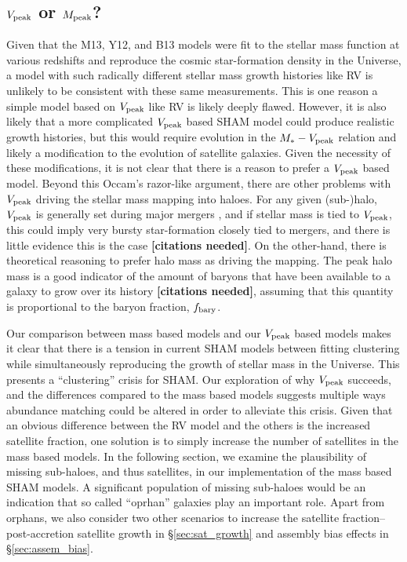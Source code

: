 \documentclass[a4paper,fleqn,usenatbib]{mnras}
\begin{document}
\subsection{$V_{\rm peak}$ or $M_{\rm peak}$?}

Given that the M13, Y12, and B13 models were fit to the stellar mass function at various redshifts and reproduce the cosmic star-formation density in the Universe, a model with such radically different stellar mass growth histories like RV is unlikely to be consistent with these same measurements.  This is one reason a simple model based on $V_{\rm peak}$ like RV is likely deeply flawed.  However, it is also likely that a more complicated $V_{\rm peak}$ based SHAM model could produce realistic growth histories, but this would require evolution in the $M_* - V_{\rm peak}$ relation and likely a modification to the evolution of satellite galaxies.  Given the necessity of these modifications, it is not clear that there is a reason to prefer a $V_{\rm peak}$ based model.  Beyond this Occam's razor-like argument, there are other problems with $V_{\rm peak}$ driving the stellar mass mapping into haloes.  For any given (sub-)halo, $V_{\rm peak}$ is generally set during major mergers \citep[1:5 or larger, ][]{Behroozi:2014bg}, and if stellar mass is tied to $V_{\rm peak}$, this could imply very bursty star-formation closely tied to mergers, and there is little evidence this is the case {\bf [citations needed]}.  On the other-hand, there is theoretical reasoning to prefer halo mass as driving the mapping.  The peak halo mass is a good indicator of the amount of baryons that have been available to a galaxy to grow over its history {\bf [citations needed]}, assuming that this quantity is proportional to the baryon fraction, $f_{\rm bary}$.  

Our comparison between mass based models and our $V_{\rm peak}$ based models makes it clear that there is a tension in current SHAM models between fitting clustering while simultaneously reproducing the growth of stellar mass in the Universe.  This presents a ``clustering'' crisis for SHAM.  Our exploration of why $V_{\rm peak}$ succeeds, and the differences compared to the mass based models suggests multiple ways abundance matching could be altered in order to alleviate this crisis.  Given that an obvious difference between the RV model and the others is the increased satellite fraction, one solution is to simply increase the number of satellites in the mass based models.  In the following section, we examine the plausibility of missing sub-haloes, and thus satellites, in our implementation of the mass based SHAM models.  A significant population of missing sub-haloes would be an indication that so called ``oprhan'' galaxies play an important role.  Apart from orphans, we also consider two other scenarios to increase the satellite fraction--post-accretion satellite growth in \S \ref{sec:sat_growth} and assembly bias effects in \S \ref{sec:assem_bias}.   
\end{document}
